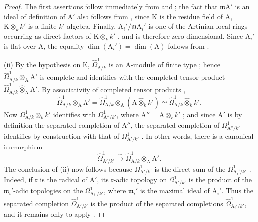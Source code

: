 \begin{proof}
The first assertions follow immediately from  and ; the fact that $\mathfrak{m}\mathrm{A}'$ is an ideal of definition of $\mathrm{A}'$ also follows from , since $\mathrm{K}$ is the residue field of $\mathrm{A}$, $\mathrm{K}\otimes_k k'$ is a finite $k'$-algebra.
Finally, $\mathrm{A}_i'/\mathfrak{m}\mathrm{A}_i'$ is one of the Artinian local rings occurring as direct factors of $\mathrm{K}\otimes_k k'$ , and is therefore zero-dimensional. Since $\mathrm{A}_i'$ is flat over $\mathrm{A}$, the equality $\dim(\mathrm{A}_i')=\dim(\mathrm{A})$ follows from .

(ii) By the hypothesis on $\mathrm{K}$, $\hat{\Omega}^1_{\mathrm{A}/k}$ is an $\mathrm{A}$-module of finite type ; hence $\hat{\Omega}^1_{\mathrm{A}/k}\otimes_{\mathrm{A}}\mathrm{A}'$ is complete and identifies with the completed tensor product $\hat{\Omega}^1_{\mathrm{A}/k}\widehat{\otimes}_{\mathrm{A}}\mathrm{A}'$. By associativity of completed tensor products ,
\[
  \hat{\Omega}^1_{\mathrm{A}/k}\otimes_{\mathrm{A}}\mathrm{A}'
  =\hat{\Omega}^1_{\mathrm{A}/k}\otimes_{\mathrm{A}}(\mathrm{A}\widehat{\otimes}_kk')
  \simeq\hat{\Omega}^1_{\mathrm{A}/k}\widehat{\otimes}_kk'.
\]
Now $\Omega^1_{\mathrm{A}/k}\otimes_kk'$ identifies with $\Omega^1_{\mathrm{A}''/k'}$, where $\mathrm{A}''=\mathrm{A}\otimes_kk'$ ; and since $\mathrm{A}'$ is by definition the separated completion of $\mathrm{A}''$, the separated completion of $\Omega^1_{\mathrm{A}''/k'}$ identifies by construction with that of $\Omega^1_{\mathrm{A}'/k'}$ . In other words, there is a canonical isomorphism
\[
  \hat{\Omega}^1_{\mathrm{A}'/k'}\xrightarrow{\sim}
  \hat{\Omega}^1_{\mathrm{A}/k}\otimes_{\mathrm{A}}\mathrm{A}'.
\]
The conclusion of (ii) now follows because $\Omega^1_{\mathrm{A}'/k'}$ is the direct sum of the $\Omega^1_{\mathrm{A}_i'/k'}$ . Indeed, if $\mathfrak r$ is the radical of $\mathrm{A}'$, its $\mathfrak r$-adic topology on $\Omega^1_{\mathrm{A}'/k'}$ is the product of the $\mathfrak m_i'$-adic topologies on the $\Omega^1_{\mathrm{A}_i'/k'}$, where $\mathfrak m_i'$ is the maximal ideal of $\mathrm{A}_i'$. Thus the separated completion $\hat{\Omega}^1_{\mathrm{A}'/k'}$ is the product of the separated completions $\hat{\Omega}^1_{\mathrm{A}_i'/k'}$, and it remains only to apply .
\end{proof}

